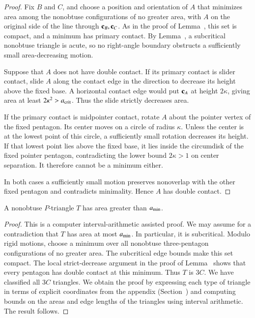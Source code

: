 \begin{proof}
  Fix $B$ and $C$, and choose a position and orientation of $A$ that
  minimizes area among the nonobtuse configurations of no greater area,
  with $A$ on the original side of the line through ${\mathbf c}_B,{\mathbf c}_C$.
  As in the proof of Lemma~, this set is compact,
  and a minimum has primary contact. By Lemma~, a
  subcritical nonobtuse triangle is acute, so no right-angle boundary
  obstructs a sufficiently small area-decreasing motion.

  Suppose that $A$ does not have double contact. If its primary
  contact is slider contact, slide $A$ along the contact edge in the
  direction to decrease its height above the fixed base. A horizontal
  contact edge would put ${\mathbf c}_A$ at height $2\kappa$, giving area at
  least $2\kappa^2>a_\text{crit}$. Thus the slide strictly decreases area.

  If the primary contact is midpointer contact, rotate $A$ about the
  pointer vertex of the fixed pentagon. Its center moves on a circle
  of radius $\kappa$. Unless the center is at the lowest point of
  this circle, a sufficiently small rotation decreases its height.
  If that lowest point lies above the fixed base, it lies inside
  the circumdisk of the fixed pointer pentagon, contradicting the
  lower bound $2\kappa>1$ on center separation. It therefore cannot
  be a minimum either.

  In both cases a sufficiently small motion preserves nonoverlap
  with the other fixed pentagon and contradicts minimality. Hence
  $A$ has double contact.
\end{proof}

\begin{lemma}  
A nonobtuse $P$-triangle $T$ has area greater than $a_\text{min}$.
\end{lemma}

\begin{proof} 
  This is a computer interval-arithmetic assisted proof.  We may assume for a contradiction
  that $T$ has area at most $a_\text{min}$.  In particular, it is
  subcritical. Modulo rigid motions, choose a minimum over all
  nonobtuse three-pentagon configurations of no greater area. The
  subcritical edge bounds make this set compact. The local
  strict-decrease argument in the proof of Lemma~
  shows that every pentagon has double contact at this minimum.
  Thus $T$ is $3C$.  We have classified all $3C$ triangles.  We obtain the proof
  by expressing each type of triangle in terms of explicit
  coordinates from the appendix (Section~) and
  computing bounds on the areas and edge lengths of the triangles
  using interval arithmetic.  The result follows.
\end{proof}

